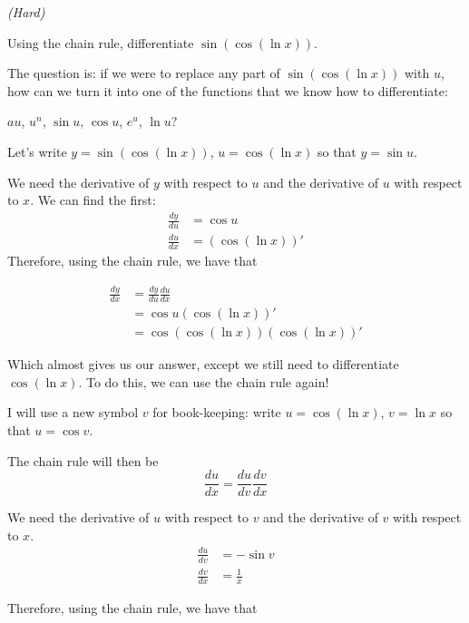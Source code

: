 \begin{example} \emph{(Hard)}

    Using the chain rule, differentiate $\sin(\cos(\ln x))$.
\end{example}
\begin{solution}
    The question is: if we were to replace any part of $\sin(\cos(\ln x))$ with $u$, how can we turn it into one of the functions that we know how to differentiate:
    
    $au$, $u^n$, $\sin u$, $\cos u$, $e^u$, $\ln u$?

    Let's write $y=\sin(\cos(\ln x))$, $u = \cos(\ln x)$ so that $y = \sin u$.

    We need the derivative of $y$ with respect to $u$ and the derivative of $u$ with respect to $x$. We can find the first:
    \begin{align*}
        \frac{dy}{du} &= \cos u \tag{using the derivative of $\sin u$} \\
        \frac{du}{dx} &=  (\cos(\ln x))' \tag{leave for later}
    \end{align*}
    Therefore, using the chain rule, we have that 

    \begin{align*}
        \frac{dy}{dx} &= \frac{dy}{du} \frac{du}{dx} \\
         &=  \cos u (\cos(\ln x))'  \tag{substituting our workings} \\
         &= \cos (\cos(\ln x)) (\cos(\ln x))' \tag{using $u = \cos(\ln x)$}
    \end{align*}

    Which almost gives us our answer, except we still need to differentiate $\cos(\ln x)$. To do this, we can use the chain rule again!
    
    I will use a new symbol $v$ for book-keeping: write $u = \cos(\ln x)$, $v = \ln x$ so that $u = \cos v$.
    
    The chain rule will then be 
    \[ \frac{du}{dx} = \frac{du}{dv} \frac{dv}{dx}\]

    We need the derivative of $u$ with respect to $v$ and the derivative of $v$ with respect to $x$.
    \begin{align*}
        \frac{du}{dv} &= -\sin v \tag{using the derivative of $\cos v$} \\
        \frac{dv}{dx} &=  \frac{1}{x} \tag{using the derivative of $\ln x$}
    \end{align*}

    Therefore, using the chain rule, we have that 


\end{solution}
